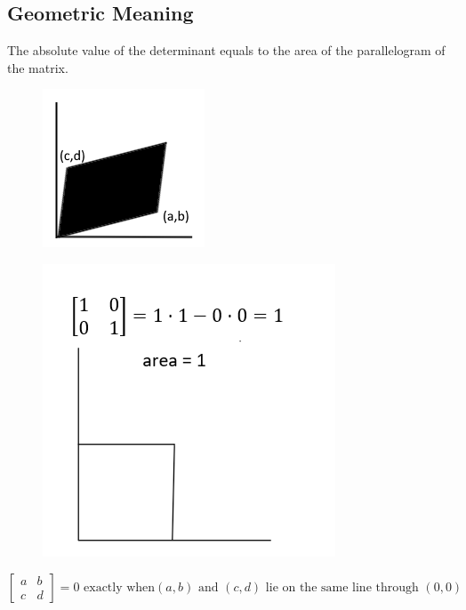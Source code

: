 \documentclass{article}
\begin{document}
\subsection{Geometric Meaning}
The absolute value of the determinant equals to the area of the parallelogram of the matrix.
\begin{figure}[h!]
    \centering
    \includegraphics[scale=1.0]{geomeandeterminant.png}
    \label{}
\end{figure}
\begin{figure}[h!]
    \centering
    \includegraphics[scale=0.5]{2D-DeterminantExample.png}
    \label{}
\end{figure}

\[\begin{bmatrix}
    a&b\\
    c&d
\end{bmatrix}=0 \mbox{ exactly when$(a,b)$ and $(c,d)$ lie on the same line through $(0,0)$}\]
\end{document}
